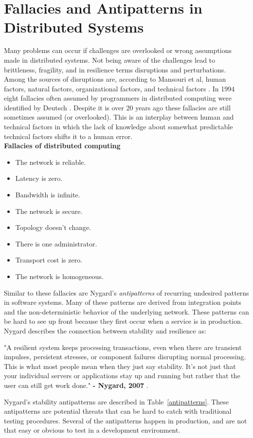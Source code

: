 \section{Fallacies and Antipatterns in Distributed Systems}
Many problems can occur if challenges are overlooked or wrong assumptions made in distributed systems. Not being aware of the challenges lead to brittleness, fragility, and in resilience terms disruptions and perturbations. Among the sources of disruptions are, according to Mansouri et al, human factors, natural factors, organizational factors, and technical factors \cite[p. 16]{omer2013resilience}. In 1994 eight fallacies often assumed by programmers in distributed computing were identified by Deutsch \cite[p. 1]{rotem2006fallacies}. Despite it is over 20 years ago these fallacies are still sometimes assumed (or overlooked). This is an interplay between human and technical factors in which the lack of knowledge about somewhat predictable technical factors shifts it to a human error. \\

\noindent
\textbf{Fallacies of distributed computing \cite[p. 1]{rotem2006fallacies}}
\vspace{-2mm}
\begin{itemize}
\setlength\itemsep{0.03em}
  \item The network is reliable.
  \item Latency is zero.
  \item Bandwidth is infinite.
  \item The network is secure.
  \item Topology doesn't change.
  \item There is one administrator.
  \item Transport cost is zero.
  \item The network is homogeneous.
\end{itemize}


\noindent
Similar to these fallacies are Nygard's \textit{antipatterns} of recurring undesired patterns in software systems. Many of these patterns are derived from integration points and the non-deterministic behavior of the underlying network. These patterns can be hard to see up front because they first occur when a service is in production. Nygard describes the connection between stability and resilience as:

\begin{citat} []
"A resilient system keeps processing transactions, even when there are transient impulses, persistent stresses, or component failures disrupting normal processing. This is what most people mean when they just say stability. It’s not just that your individual servers or applications stay up and running but rather that the user can still get work done." \textbf{- Nygard, 2007} \cite[p. 24]{nygard2007release}.
\end{citat}

\noindent
Nygard's stability antipatterns are described in Table~\ref{antipatterns}. These antipatterns are potential threats that can be hard to catch with traditional testing procedures. Several of the antipatterns happen in production, and are not that easy or obvious to test in a development environment.